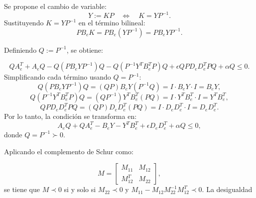 \begin{itemize}
Se propone el cambio de variable:
\begin{equation*}
    Y := K P \quad \Longleftrightarrow \quad K = Y P^{-1}.
\end{equation*}
Sustituyendo \(K = Y P^{-1}\) en el término bilineal:
\begin{equation*}
    P B_e K = P B_e (Y P^{-1}) = P B_e Y P^{-1}.
\end{equation*}

Definiendo \(Q := P^{-1}\), se obtiene:

\begin{equation*}
    Q A_e^T + A_e Q - Q (P B_e Y P^{-1}) Q - Q (P^{-1} Y^T B_e^T P) Q + \epsilon Q P D_e D_e^T P Q + \alpha Q \leq 0.
\end{equation*}
Simplificando cada término usando \(Q = P^{-1}\):
\begin{equation*}
    Q (P B_e Y P^{-1}) Q = (Q P) B_e Y (P^{-1} Q) = I \cdot B_e Y \cdot I = B_e Y,
\end{equation*}
\begin{equation*}
    Q (P^{-1} Y^T B_e^T P) Q = (Q P^{-1}) Y^T B_e^T (P Q) = I \cdot Y^T B_e^T \cdot I = Y^T B_e^T,
\end{equation*}
\begin{equation*}
    Q P D_e D_e^T P Q = (Q P) D_e D_e^T (P Q) = I \cdot D_e D_e^T \cdot I = D_e D_e^T.
\end{equation*}
Por lo tanto, la condición se transforma en:
\begin{equation*}
    A_e Q + Q A_e^T - B_e Y - Y^T B_e^T + \epsilon D_e D_e^T + \alpha Q \leq 0,
\end{equation*}
donde \(Q = P^{-1} \succ 0\). 

Aplicando el complemento de Schur como:

\begin{equation*}
    M = \begin{bmatrix} M_{11} & M_{12} \\ M_{12}^T & M_{22} \end{bmatrix},
\end{equation*}
se tiene que \(M \prec 0\) si y solo si \(M_{22} \prec 0\) y \(M_{11} - M_{12} M_{22}^{-1} M_{12}^T \prec 0\). La desigualdad


\end{itemize}
